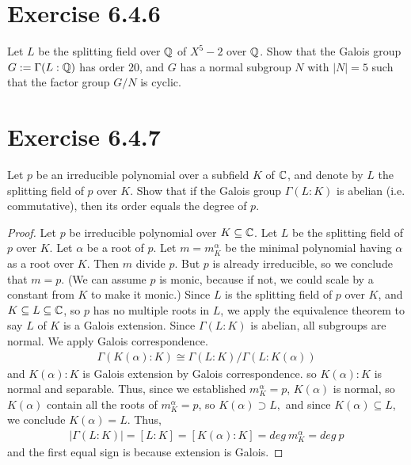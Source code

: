 \documentclass[12pt,english]{article}
\begin{document}
\section*{Exercise 6.4.6}
\begin{question}
    Let $L$ be the splitting field over $\mathbb{Q}$ of $X^5 - 2$ over $\mathbb{Q}$. 
    Show that the Galois group $G:=\Gamma(L:\mathbb{Q})$ has order $20$,
    and $G$ has a normal subgroup $N$ with $\lvert N \rvert = 5$
    such that the factor group $G/N$ is cyclic.
\end{question}

\section*{Exercise 6.4.7}
\begin{question}
    Let $p$ be an irreducible polynomial over a subfield $K$ of $\mathbb{C}$, and denote by $L$ the splitting field of $p$ over $K$. 
    Show that if the Galois group $\Gamma (L:K)$ is abelian (i.e. commutative), 
    then its order equals the degree of $p$.
\end{question}

\begin{proof}
    Let $p$ be irreducible polynomial over $K \subseteq \mathbb{C}$.
    Let $L$ be the splitting field of $p$ over $K$.
    Let $\alpha$ be a root of $p$.
    Let $m = m_K^{\alpha}$ be the minimal polynomial having $\alpha$ as a root over $K$.
    Then $m$ divide $p$. But $p$ is already irreducible, so we conclude that $m = p$. 
    (We can assume $p$ is monic, because if not, we could scale by a constant
    from $K$ to make it monic.)
    Since $L$ is the splitting field of $p$ over $K$, and $K \subseteq L \subseteq \mathbb{C}$, 
    so $p$ has no multiple roots in $L$, we apply the equivalence theorem
    to say $L$ of $K$ is a Galois extension. Since $\Gamma(L:K)$ is abelian,
    all subgroups are normal. We apply Galois correspondence.
    \begin{align}
        \Gamma(K(\alpha):K) \cong \Gamma(L:K)/\Gamma(L:K(\alpha))
    \end{align}
    and $K(\alpha):K$ is Galois extension by Galois correspondence.
    so $K(\alpha):K$ is normal and separable.
    Thus, since we established $m_K^{\alpha} = p$, $K(\alpha)$ is normal,
    so $K(\alpha)$ contain all the roots of $m_K^{\alpha}=p$, 
    so $K(\alpha) \supset L,$ and since $K(\alpha) \subseteq L$,
    we conclude $K(\alpha) = L$. Thus,
    \begin{align}
        \lvert \Gamma(L:K) \rvert = [L:K] = [K(\alpha):K] = deg \ m_K^{\alpha} = deg \ p
    \end{align}
    and the first equal sign is because extension is Galois.
    
\end{proof}
\end{document}
